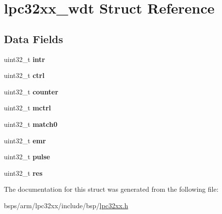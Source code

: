 \hypertarget{structlpc32xx__wdt}{}\section{lpc32xx\+\_\+wdt Struct Reference}
\label{structlpc32xx__wdt}
\subsection*{Data Fields}
\begin{DoxyCompactItemize}
\item 
\mbox{\label{structlpc32xx__wdt_a9804bcb2abc3a5d78cc2e699d8aae334}} 
uint32\+\_\+t {\bfseries intr}
\item 
\mbox{\label{structlpc32xx__wdt_afc48ea11f057960db19f630bd23621a4}} 
uint32\+\_\+t {\bfseries ctrl}
\item 
\mbox{\label{structlpc32xx__wdt_a7442ef80257c2b8f6e35c96ece410a8d}} 
uint32\+\_\+t {\bfseries counter}
\item 
\mbox{\label{structlpc32xx__wdt_a363499e4f3b9f71d64b470f32fdce68e}} 
uint32\+\_\+t {\bfseries mctrl}
\item 
\mbox{\label{structlpc32xx__wdt_a58a13625d8c6db84e90fadce2e80a635}} 
uint32\+\_\+t {\bfseries match0}
\item 
\mbox{\label{structlpc32xx__wdt_a76784c4afe37973f187441d64b24f4c6}} 
uint32\+\_\+t {\bfseries emr}
\item 
\mbox{\label{structlpc32xx__wdt_a894ce3c5d5adc323edd12e129e0c197a}} 
uint32\+\_\+t {\bfseries pulse}
\item 
\mbox{\label{structlpc32xx__wdt_a969ecba21c10682be87981022e14e74d}} 
uint32\+\_\+t {\bfseries res}
\end{DoxyCompactItemize}


The documentation for this struct was generated from the following file\+:\begin{DoxyCompactItemize}
\item 
bsps/arm/lpc32xx/include/bsp/\mbox{\hyperlink{lpc32xx_8h}{lpc32xx.\+h}}\end{DoxyCompactItemize}
